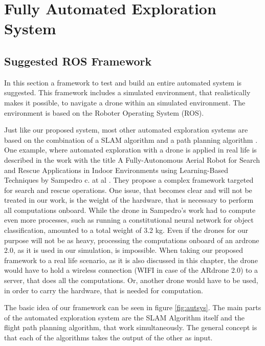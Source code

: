 \chapter{Fully Automated Exploration System}
	
\section{Suggested ROS Framework} \label{rosframe}
	
	In this section a framework to test and build an entire automated system is suggested. This framework includes a 
	simulated environment, that realistically makes it possible, to navigate a drone within an simulated environment. The environment 
	is based on the Roboter Operating System (ROS).
	
	Just like our proposed system, most other automated exploration systems are based on the combination of a SLAM algorithm and 
	a path planning algorithm \cite{aut1} \cite{deep} \cite{accurat} \cite{aut2}. One example, where automated exploration with a drone is 
	applied in real life is described in the work with the title A Fully-Autonomous Aerial Robot for Search and Rescue Applications
in Indoor Environments using Learning-Based Techniques by Sampedro c. at al \cite{aut1}. They propose a complex framework targeted for search and 
    rescue operations. One issue, that becomes clear and will not be treated in our work, is the weight of the hardware, that is necessary to perform all computations 
	onboard. While the drone in Sampedro's work had to compute even more processes, such as running a constitutional neural network for object classification, 
	amounted to a total weight of 3.2 kg. Even if the drones for our purpose will not be as heavy, processing the computations onboard of an ardrone 2.0, as 
	it is used in our simulation, is impossible. When taking our proposed framework to a real life scenario, as it is also discussed in this chapter, 
	the drone would have to hold a wireless connection (WIFI in case of the ARdrone 2.0) to a server, that does all the computations. Or, another drone would have to be used, in order 
	to carry the hardware, that is needed for computation. 
	
	The basic idea of our framework can be seen in figure \ref{fig:autsys}. The main parts of the automated exploration system are the SLAM Algorithm itself
	and the flight path planning algorithm, that work simultaneously. The general concept is that each of the algorithms takes the output of the other as 
	input. 
	
